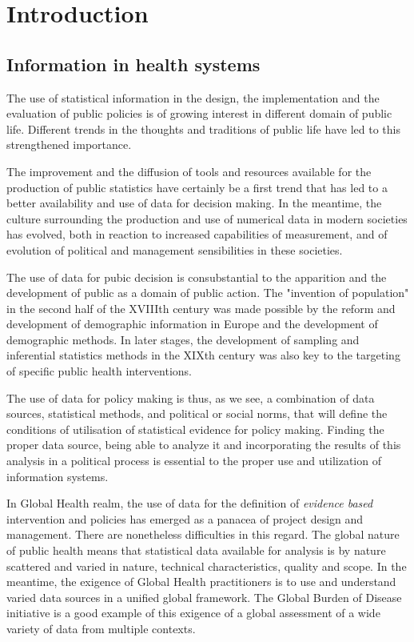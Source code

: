 \documentclass[a4paper,11pt,final,twoside]{article}
\begin{document}
\cleardoublepage
{} 
\setcounter{page}{1}

\section{Introduction}

\subsection{Information in health systems}

The use of statistical information in the design, the implementation and the evaluation of public policies is of growing interest in different domain of public life. Different trends in the thoughts and traditions of public life have led to this strengthened importance. 

The improvement and the diffusion of tools and resources available for the production of public statistics have certainly be a first trend that has led to a better availability and use of data for decision making. In the meantime, the culture surrounding the production and use of numerical data in modern societies has evolved, both in reaction to increased capabilities of measurement, and of evolution of political and management sensibilities in these societies. 

The use of data for pubic decision is consubstantial to the apparition and the development of public as a domain of public action. The "invention of population" in the second half of the XVIIIth century was made possible by the reform and development of demographic information in Europe and the development of demographic methods. In later stages, the development of sampling and inferential statistics methods in the XIXth century was also key to the targeting of specific public health interventions. 

The use of data for policy making is thus, as we see, a combination of data sources, statistical methods, and political or social norms, that will define the conditions of utilisation of statistical evidence for policy making. Finding the proper data source, being able to analyze it and incorporating the results of this analysis in a political process is essential to the proper use and utilization of information systems.

In Global Health realm, the use of data for the definition of \textit{evidence based} intervention and policies has emerged as a panacea of project design and management. There are nonetheless difficulties in this regard. The global nature of public health means that statistical data available for analysis is by nature scattered and varied in nature, technical characteristics, quality and scope. In the meantime, the exigence of Global Health practitioners is to use and understand varied data sources in a unified global framework. The Global Burden of Disease initiative is a good example of this exigence of a global assessment of a wide variety of data from multiple contexts.
\end{document}
